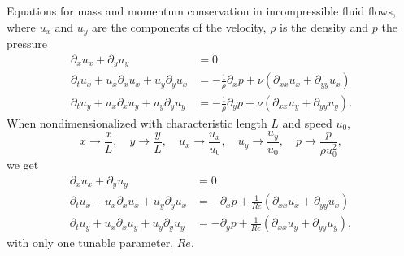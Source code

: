 Equations for mass and momentum conservation in incompressible fluid flows, where $u_x$ and $u_y$ are the components of the velocity, $\rho$ is the density and $p$ the pressure
\begin{equation}
  \label{eq: navier stokes}
  \begin{aligned}
    \partial_x u_x + \partial_y u_y & = 0 \\
    \partial_t u_x + u_x\partial_x u_x + u_y\partial_y u_x & = -\frac{1}{\rho} \partial_x p + \nu \left(\partial_{xx} u_x + \partial_{yy} u_x\right) \\
    \partial_t u_y + u_x\partial_x u_y + u_y\partial_y u_y & = -\frac{1}{\rho} \partial_y p + \nu \left(\partial_{xx} u_y + \partial_{yy} u_y\right).
  \end{aligned}
\end{equation}
When nondimensionalized with characteristic length $L$ and speed $u_0$,
\begin{equation}
    x  \rightarrow \frac{x}{L},\quad
    y  \rightarrow \frac{y}{L},\quad
    u_x  \rightarrow \frac{u_x}{u_0},\quad
    u_y  \rightarrow \frac{u_y}{u_0},\quad
    p  \rightarrow \frac{p}{\rho u_0^2},
\end{equation}
we get
\begin{equation}
  \label{eq: navier stokes nondim}
  \begin{aligned}
    \partial_x u_x + \partial_y u_y & = 0 \\
    \partial_t u_x + u_x\partial_x u_x + u_y\partial_y u_x & = - \partial_x p + \frac{1}{Re} \left(\partial_{xx} u_x + \partial_{yy} u_x\right) \\
    \partial_t u_y + u_x\partial_x u_y + u_y\partial_y u_y & = - \partial_y p + \frac{1}{Re} \left(\partial_{xx} u_y + \partial_{yy} u_y\right),
  \end{aligned}
\end{equation}
with only one tunable parameter, $Re$.

